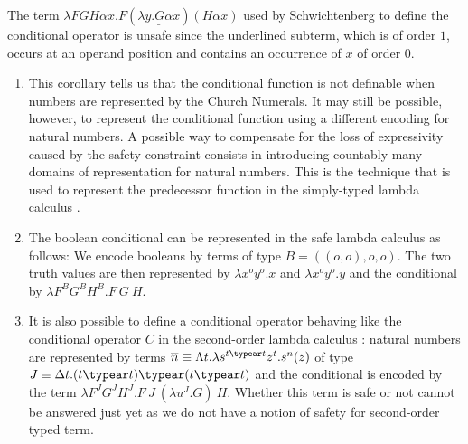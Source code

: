 \begin{example}
The term $\lambda F G H \alpha x . F ( \underline{\lambda y . G
\alpha x} ) (H \alpha x)$ used by Schwichtenberg
\cite{citeulike:622637} to define the conditional operator is unsafe
since the underlined subterm, which is of order $1$, occurs at an
operand position and contains an occurrence of $x$ of order $0$.
\end{example}

\begin{remark} \hfill
\begin{enumerate}
\item This corollary tells us that the conditional function is not
definable when numbers are represented by the Church Numerals.
It may still be possible, however, to represent the conditional
function using a different encoding for natural numbers. A
possible way to compensate for the loss of expressivity caused
by the safety constraint consists in introducing countably many
domains of representation for natural numbers. This is the
technique that is used to represent the predecessor function in
the simply-typed lambda calculus
\cite{DBLP:journals/jacm/FortuneLO83}.

\item The boolean conditional can be represented in the safe
lambda calculus as follows: We encode booleans by terms of type
$B=((o,o),o,o)$. The two truth values are then represented by
$\lambda x^o y^o.x$ and $\lambda x^o y^o.y$ and the conditional by
$\lambda F^B G^B H^B . F~G~H$.

\item It is also possible to define a conditional operator behaving like
the conditional operator $C$ in the second-order lambda calculus
\cite{DBLP:journals/jacm/FortuneLO83}: natural numbers are
represented by terms $\overline{n} \equiv \Lambda t.\lambda
s^{t\typear t} z^t.s^n(z)$ of type $J \equiv \Delta t.(t\typear
t) \typear (t \typear t)$ and the conditional is encoded by the
term $\lambda F^J G^J H^J.F~J~(\lambda u^J . G)~H$. Whether this
term is safe or not cannot be answered just yet as we do not
have a notion of safety for second-order typed term.
\end{enumerate}
\end{remark}





\newcommand{\zaioncencode}{\underline} %

\newcommand{\zaiwordtyp}{\mathbf{B}} %
\newcommand{\closedof}[1]{{\rm Cl}(#1)} %

